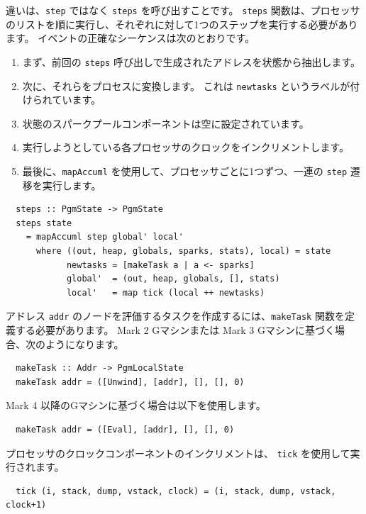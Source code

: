 \documentclass{jbook}
\begin{document}
違いは、\texttt{step} ではなく \texttt{steps} を呼び出すことです。
\texttt{steps} 関数は、プロセッサのリストを順に実行し、それぞれに対して1つのステップを実行する必要があります。
イベントの正確なシーケンスは次のとおりです。

\begin{enumerate}
	\item まず、前回の \texttt{steps} 呼び出しで生成されたアドレスを状態から抽出します。
	\item 次に、それらをプロセスに変換します。
	      これは \texttt{newtasks} というラベルが付けられています。
	\item 状態のスパークプールコンポーネントは空に設定されています。
	\item 実行しようとしている各プロセッサのクロックをインクリメントします。
	\item 最後に、\texttt{mapAccuml} を使用して、プロセッサごとに1つずつ、一連の \texttt{step} 遷移を実行します。
\end{enumerate}

\begin{verbatim}
  steps :: PgmState -> PgmState
  steps state
    = mapAccuml step global' local'
      where ((out, heap, globals, sparks, stats), local) = state
            newtasks = [makeTask a | a <- sparks]
            global'  = (out, heap, globals, [], stats)
            local'   = map tick (local ++ newtasks)
\end{verbatim}

アドレス \texttt{addr} のノードを評価するタスクを作成するには、\texttt{makeTask} 関数を定義する必要があります。
Mark 2 Gマシンまたは Mark 3 Gマシンに基づく場合、次のようになります。

\begin{verbatim}
  makeTask :: Addr -> PgmLocalState
  makeTask addr = ([Unwind], [addr], [], [], 0)
\end{verbatim}

Mark 4 以降のGマシンに基づく場合は以下を使用します。

\begin{verbatim}
  makeTask addr = ([Eval], [addr], [], [], 0)
\end{verbatim}

プロセッサのクロックコンポーネントのインクリメントは、 \texttt{tick} を使用して実行されます。

\begin{verbatim}
  tick (i, stack, dump, vstack, clock) = (i, stack, dump, vstack, clock+1)
\end{verbatim}
\end{document}
